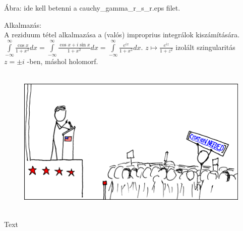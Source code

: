 \documentclass[12pt,a4paper]{scrartcl}
\newenvironment{pelda}{}{}
\newenvironment{ajanlofig}{\begin{figure}\begin{center}}{
\end{center}\end{figure}}
\begin{document}
Ábra: ide kell betenni a cauchy\_gamma\_r\_s\_r.eps filet.

\begin{pelda}

Alkalmazás:\\
A reziduum tétel alkalmazása a (valós) improprius integrálok
kiszámítására.
\({\int\limits_{- \infty}^{\infty}{\frac{\cos x}{1 + x^{2}}dx}} = {\int\limits_{- \infty}^{\infty}{\frac{\cos x + i\sin x}{1 + x^{2}}dx}} = {\int\limits_{- \infty}^{\infty}{\frac{e^{ix}}{1 + x^{2}}dx}}\).
\(\left. z\mapsto\frac{e^{iz}}{1 + z^{2}} \right.\) izolált
szingularitás \(z = \pm i\) -ben, máshol holomorf.

\end{pelda}

\begin{ajanlo}

\begin{ajanlofig}

\href{https://xkcd.com}{\includegraphics[width=5.20833in,height=2.82292in]{wikipedian_protester.png}}

\end{ajanlofig}

Text

\end{ajanlo}
\end{document}

